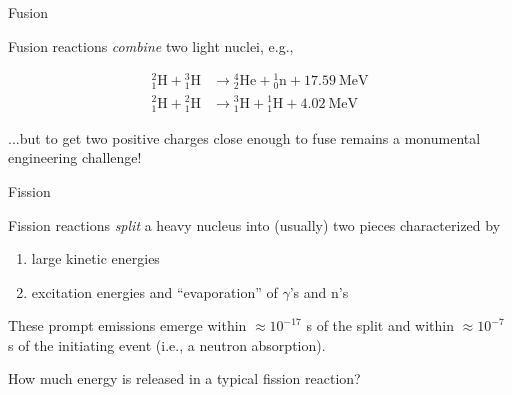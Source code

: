 \documentclass[aspectratio=1610]{beamer}
\begin{document}
\begin{frame}{Fusion}

Fusion reactions {\it combine} two light nuclei, e.g., 

\begin{align*}
 \tag{D-T}
 {}^2_1 \text{H} +  {}^3_1 \text{H} &\longrightarrow  {}^4_2 \text{He} +  {}^1_0 \text{n} + 17.59~\text{MeV} \\
 \tag{D-D}
 {}^2_1 \text{H} +  {}^2_1 \text{H} &\longrightarrow  {}^3_1 \text{H} +  {}^1_1 \text{H} + 4.02~\text{MeV}
\end{align*}

\pause 
\vfill 

...but to get two positive charges close enough to fuse remains a monumental engineering challenge!

\end{frame}


\begin{frame}{Fission}

Fission reactions {\it split} a heavy nucleus into (usually) two pieces 
characterized by

\begin{enumerate}
 \item large kinetic energies 
 \item excitation energies and ``evaporation'' of $\gamma$'s and n's
\end{enumerate}

These prompt emissions emerge  within
$\approx10^{-17}$ s of the split 
and within $\approx10^{-7}$ s of the initiating event (i.e., a neutron absorption). 

\pause 
\vfill 

How much energy is released in a typical fission reaction?

\end{frame}
\end{document}
